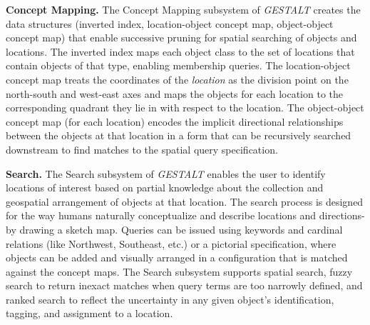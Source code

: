 \textbf{Concept Mapping.}
The Concept Mapping subsystem of \emph{GESTALT} creates the data structures (inverted index, location-object concept map, object-object concept map) that enable successive pruning for spatial searching of objects and locations. 
The inverted index maps each object class to the set of locations that contain objects of that type, enabling membership queries. 
The location-object concept map treats the coordinates of the \textit{location} as the division point on the north-south and west-east axes and maps the objects for each location to the corresponding quadrant they lie in with respect to the location.
The object-object concept map (for each location) encodes the implicit directional relationships between the objects at that location in a form that can be recursively searched downstream to find matches to the spatial query specification. 

\textbf{Search.}
The Search subsystem of \emph{GESTALT} enables the user to identify locations of interest based on partial knowledge about the collection and geospatial arrangement of objects at that location. 
The search process is designed for the way humans naturally conceptualize and describe locations and directions- by drawing a sketch map.
Queries can be issued using keywords and cardinal relations (like Northwest, Southeast, etc.) or a pictorial specification, where objects can be added and visually arranged in a configuration that is matched against the concept maps.
The Search subsystem supports spatial search, fuzzy search to return inexact matches when query terms are too narrowly defined, and ranked search to reflect the uncertainty in any given object's identification, tagging, and assignment to a location.



